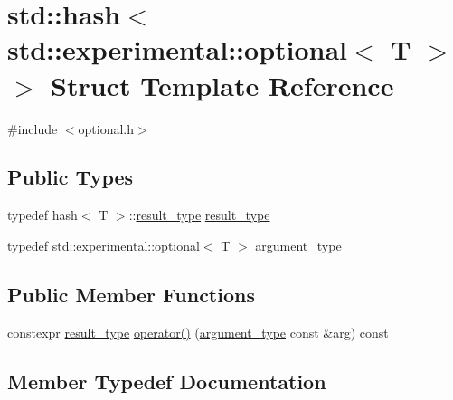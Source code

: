 \hypertarget{structstd_1_1hash_3_01std_1_1experimental_1_1optional_3_01_t_01_4_01_4}{}\section{std\+:\+:hash$<$ std\+:\+:experimental\+:\+:optional$<$ T $>$ $>$ Struct Template Reference}
\label{structstd_1_1hash_3_01std_1_1experimental_1_1optional_3_01_t_01_4_01_4}


{\ttfamily \#include $<$optional.\+h$>$}

\subsection*{Public Types}
\begin{DoxyCompactItemize}
\item 
typedef hash$<$ T $>$\+::\mbox{\hyperlink{structstd_1_1hash_3_01std_1_1experimental_1_1optional_3_01_t_01_4_01_4_a1ffc134496ff2e1dedb167899d460b6b}{result\+\_\+type}} \mbox{\hyperlink{structstd_1_1hash_3_01std_1_1experimental_1_1optional_3_01_t_01_4_01_4_a1ffc134496ff2e1dedb167899d460b6b}{result\+\_\+type}}
\item 
typedef \mbox{\hyperlink{classstd_1_1experimental_1_1optional}{std\+::experimental\+::optional}}$<$ T $>$ \mbox{\hyperlink{structstd_1_1hash_3_01std_1_1experimental_1_1optional_3_01_t_01_4_01_4_a990f41de75472068a98961bde97c9f6f}{argument\+\_\+type}}
\end{DoxyCompactItemize}
\subsection*{Public Member Functions}
\begin{DoxyCompactItemize}
\item 
constexpr \mbox{\hyperlink{structstd_1_1hash_3_01std_1_1experimental_1_1optional_3_01_t_01_4_01_4_a1ffc134496ff2e1dedb167899d460b6b}{result\+\_\+type}} \mbox{\hyperlink{structstd_1_1hash_3_01std_1_1experimental_1_1optional_3_01_t_01_4_01_4_a3fbf26e96a387fac81dc1fcaf163ce3c}{operator()}} (\mbox{\hyperlink{structstd_1_1hash_3_01std_1_1experimental_1_1optional_3_01_t_01_4_01_4_a990f41de75472068a98961bde97c9f6f}{argument\+\_\+type}} const \&arg) const
\end{DoxyCompactItemize}


\subsection{Member Typedef Documentation}
\mbox{\label{structstd_1_1hash_3_01std_1_1experimental_1_1optional_3_01_t_01_4_01_4_a990f41de75472068a98961bde97c9f6f}} 
